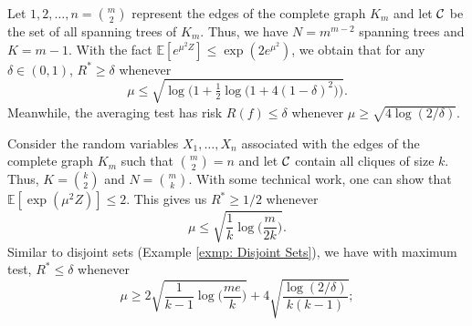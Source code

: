 \documentclass[10pt, oneside]{article}
\begin{document}
\begin{exmp}
  \label{exmp:Spanning Trees}
Let $1,2,\ldots,n={m\choose2}$ represent the edges of the complete graph $K_m$ and let ${\mathcal C}$ be the set of all spanning trees of $K_m$.
Thus, we have $N=m^{m-2}$ spanning trees and $K=m-1$. With the fact $\mathbb{E}[ e^{\mu^2 Z} ] \le \exp(2e^{\mu^2 })$, we obtain that for any $\delta\in(0,1)$,
$R^* \ge\delta$ whenever
\[
\mu\le\sqrt{\log\bigl(1+\tfrac1 2 \log\bigl(1+4(1-\delta)^2\bigr) \bigr)}.
\]
Meanwhile, the averaging test has risk $R(f) \le\delta$ whenever $\mu\ge\sqrt{4\log(2/\delta)}$.
\end{exmp}

\begin{exmp}
  Consider the random variables $X_1,\ldots,X_n$ associated with the edges of the complete graph $K_m$ such that ${m\choose2}=n$ and let ${\mathcal C}$ contain all cliques of size $k$. Thus, $K={k\choose2}$ and $N={m\choose k}$. With some technical work, one can show that $\mathbb{E}[ \exp(\mu^2Z) ] \le2$. This gives us $R^* \ge1/2$ whenever
%
\[
\mu\le\sqrt{\frac{1}{k} \log\biggl(\frac{m}{2k} \biggr)}.
\]
Similar to disjoint sets (Example \ref{exmp: Disjoint Sets}), we have with maximum test, $R^* \le\delta$ whenever
%
\[
\mu\ge
2\sqrt{\frac{1}{k-1} \log\biggl(\frac{me}{k} \biggr)}
+ 4\sqrt{\frac{\log(2/\delta)}{k(k-1)}};
\]
\end{exmp}
\end{document}
